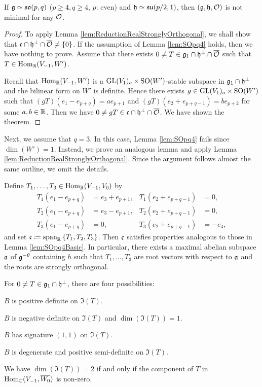 \begin{theorem} \label{thm:SOpq4}
	If $\mathfrak{g} \simeq \mathfrak{so}(p, q)$ ($p\geq 4, q \geq 4$, $p$: even) and $\mathfrak{h} \simeq \mathfrak{su}(p/2, 1)$, then $(\mathfrak{g}, \mathfrak{h}, \mathcal{O})$ is not minimal for any $\mathcal{O}$.
\end{theorem}

\begin{proof}
	To apply Lemma \ref{lem:ReductionRealStronglyOrthogonal}, we shall show that $\mathfrak{c} \cap \mathfrak{h}^\perp \cap \overline{\mathcal{O}} \neq \left\{0 \right\}$.
	If the assumption of Lemma \ref{lem:SOpq4} holds, then we have nothing to prove.
	Assume that there exists $0\neq T \in \mathfrak{g}_1 \cap \mathfrak{h}^\perp \cap \overline{\mathcal{O}}$ such that $T\in \mathrm{Hom}_{\mathbb{R}}(V_{-1}, W')$.

	Recall that $\mathrm{Hom}_{\mathbb{R}}(V_{-1}, W')$ is a $\mathrm{GL}(V_1)_o\times \mathrm{SO}(W')$-stable subspace in $\mathfrak{g}_1\cap \mathfrak{h}^\perp$ and the bilinear form on $W'$ is definite.
	Hence there exists $g \in \mathrm{GL}(V_1)_o\times \mathrm{SO}(W')$ such that $(gT)(e_1 - e_{p+q}) = ae_{p+1}$ and $(gT)(e_2 + e_{p+q-1}) = be_{p+2}$ for some $a, b \in \mathbb{R}$.
	Then we have $0\neq gT \in \mathfrak{c} \cap \mathfrak{h}^\perp \cap \overline{\mathcal{O}}$.
	We have shown the theorem.
\end{proof}

Next, we assume that $q = 3$.
In this case, Lemma \ref{lem:SOpq4} fails since $\dim(W') = 1$.
Instead, we prove an analogous lemma and apply Lemma \ref{lem:ReductionRealStronglyOrthogonal}.
Since the argument follows almost the same outline, we omit the details.

Define $T_1, \ldots, T_3 \in \mathrm{Hom}_{\mathbb{R}}(V_{-1}, V_0)$ by
\begin{align*}
	T_1(e_1 - e_{p+q}) &= e_3 + e_{p+1}, & T_1(e_2 + e_{p+q-1}) &= 0, \\
	T_2(e_1 - e_{p+q}) &= e_{3} - e_{p+1}, & T_2(e_2 + e_{p+q-1}) &= 0, \\
	T_3(e_1 - e_{p+q}) &= 0, & T_3(e_2 + e_{p+q-1}) &= -e_4,
\end{align*}
and set $\mathfrak{c} \coloneq \mathrm{span}_{\mathbb{R}}\left\{T_1, T_2, T_3\right\}$.
Then $\mathfrak{c}$ satisfies properties analogous to those in Lemma \ref{lem:SOpq4Basic}.
In particular, there exists a maximal abelian subspace $\mathfrak{a}$ of $\mathfrak{g}^{-\theta}$ containing $h$ such that
$T_1, \ldots, T_3$ are root vectors with respect to $\mathfrak{a}$ and the roots are strongly orthogonal.

For $0 \neq T \in \mathfrak{g}_1 \cap \mathfrak{h}^\perp$, there are four possibilities:
\begin{enumparen}
	\item $B$ is positive definite on $\Im(T)$.
	\item $B$ is negative definite on $\Im(T)$ and $\dim(\Im(T)) = 1$.
	\item $B$ has signature $(1, 1)$ on $\Im(T)$.
	\item $B$ is degenerate and positive semi-definite on $\Im(T)$.
\end{enumparen}
We have $\dim(\Im(T)) = 2$ if and only if the component of $T$ in $\mathrm{Hom}_{\mathbb{C}}(V_{-1}, \overline{W_0})$ is non-zero.

